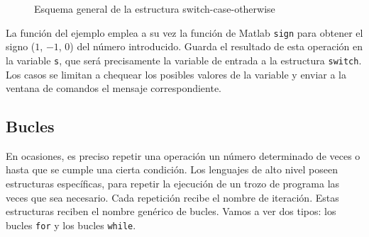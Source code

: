 



\begin{figure}[h]
\centering
{}
\caption{Esquema general de la estructura switch-case-otherwise}
\label{fig:switch}
\end{figure}

La función del ejemplo emplea a su vez la función de Matlab \texttt{sign} para obtener el signo ($1$, $-1$, $0$) del número introducido. Guarda el resultado de esta operación en la variable \texttt{s}, que será precisamente la variable de entrada a la estructura \texttt{switch}. Los casos se limitan a chequear los posibles valores de la variable y enviar a la ventana de comandos el mensaje correspondiente.
 
\subsection{Bucles}
En ocasiones, es preciso repetir una operación un número determinado de veces o hasta que se cumple una cierta condición. Los lenguajes de alto nivel poseen estructuras específicas, para repetir la ejecución de un trozo de programa las veces que sea necesario. Cada repetición recibe el nombre de iteración. Estas estructuras reciben el nombre genérico de bucles. Vamos a ver dos tipos: los bucles \texttt{for} y los bucles \texttt{while}.

